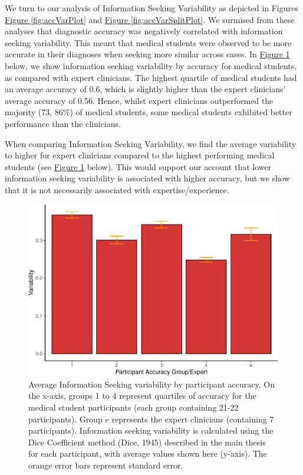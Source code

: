 \documentclass[a4paper, nobind]{templates/ociamthesis}
\begin{document}
We turn to our analysis of Information Seeking Variability as depicted in Figures \hyperref[fig:accVarPlot]{Figure \ref{fig:accVarPlot}} and \hyperref[fig:accVarSplitPlot]{Figure \ref{fig:accVarSplitPlot}}. We surmised from these analyses that diagnostic accuracy was negatively correlated with information seeking variability. This meant that medical students were observed to be more accurate in their diagnoses when seeking more similar across cases. In \hyperref[fig:accVarExpPlot]{Figure \ref{fig:accVarExpPlot}} below, we show information seeking variability by accuracy for medical students, as compared with expert clinicians. The highest quartile of medical students had an average accuracy of 0.6, which is slightly higher than the expert clinicians' average accuracy of 0.56. Hence, whilst expert clinicians outperformed the majority (73, 86\%) of medical students, some medical students exhibited better performance than the clinicians.

\hfill\break
When comparing Information Seeking Variability, we find the average variability to higher for expert clinicians compared to the highest performing medical students (see \hyperref[fig:accVarExpPlot]{Figure \ref{fig:accVarExpPlot}} below). This would support our account that lower information seeking variability is associated with higher accuracy, but we show that it is not necessarily associated with expertise/experience.

\newpage

\begin{figure}[H]

{\centering \includegraphics[width=1\linewidth]{_main_files/figure-latex/accVarExpPlot-1} 

}

\caption[Online Study Appendix: Expert Information Seeking Variabiity by Accuracy (Bar Graph)]{Average Information Seeking variability by participant accuracy. On the x-axis, groups 1 to 4 represent quartiles of accuracy for the medical student participants (each group containing 21-22 participants). Group e represents the expert clinicians (containing 7 participants). Information seeking variability is calculated using the Dice Coefficient method (Dice, 1945) described in the main thesis for each participant, with average values shown here (y-axis). The orange error bars represent standard error.}\label{fig:accVarExpPlot}
\end{figure}
\end{document}
